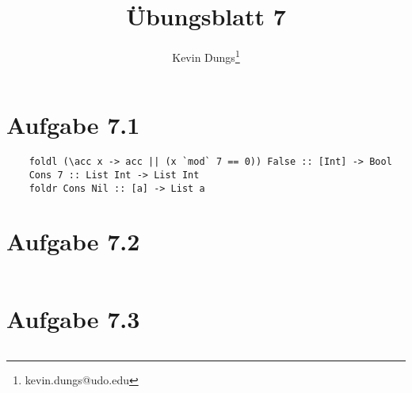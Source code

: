 \documentclass[a4paper]{scrartcl}
\title{Übungsblatt 7}
\author{Kevin Dungs\thanks{kevin.dungs@udo.edu}}
\begin{document}
\maketitle

\section*{Aufgabe 7.1}
\begin{verbatim}
    foldl (\acc x -> acc || (x `mod` 7 == 0)) False :: [Int] -> Bool
    Cons 7 :: List Int -> List Int
    foldr Cons Nil :: [a] -> List a
\end{verbatim}

\section*{Aufgabe 7.2}
\inputminted{haskell}{company.hs}

\section*{Aufgabe 7.3}
\inputminted{haskell}{bool.hs}
\end{document}
